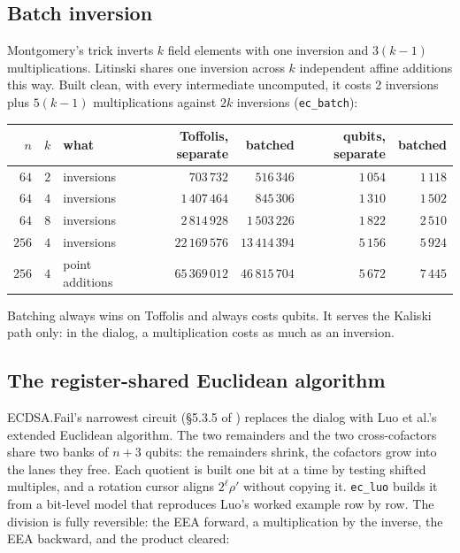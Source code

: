\documentclass[11pt]{article}
\theoremstyle{plain}
\theoremstyle{remark}
\begin{document}
\subsection{Batch inversion}

Montgomery's trick inverts $k$ field elements with one inversion and $3(k-1)$ multiplications.
Litinski \cite{ec:litinski23} shares one inversion across $k$ independent affine additions this
way. Built clean, with every intermediate uncomputed, it costs 2 inversions plus $5(k-1)$
multiplications against $2k$ inversions (\texttt{ec\_batch}):

\begin{center}\small
\begin{tabular}{rrlrrrr}
\toprule
$n$ & $k$ & what & Toffolis, separate & batched & qubits, separate & batched\\
\midrule
$64$ & $2$ & inversions & $703\,732$ & $516\,346$ & $1\,054$ & $1\,118$\\
$64$ & $4$ & inversions & $1\,407\,464$ & $845\,306$ & $1\,310$ & $1\,502$\\
$64$ & $8$ & inversions & $2\,814\,928$ & $1\,503\,226$ & $1\,822$ & $2\,510$\\
$256$ & $4$ & inversions & $22\,169\,576$ & $13\,414\,394$ & $5\,156$ & $5\,924$\\
$256$ & $4$ & point additions & $65\,369\,012$ & $46\,815\,704$ & $5\,672$ & $7\,445$\\
\bottomrule
\end{tabular}
\end{center}

\noindent Batching always wins on Toffolis and always costs qubits. It serves the Kaliski path only:
in the dialog, a multiplication costs as much as an inversion.

\subsection{The register-shared Euclidean algorithm}

ECDSA.Fail's narrowest circuit (\S5.3.5 of \cite{ec:ecdsafail26}) replaces the dialog with Luo et
al.'s extended Euclidean algorithm. The two remainders and the two cross-cofactors share two banks
of $n+3$ qubits: the remainders shrink, the cofactors grow into the lanes they free. Each quotient is
built one bit at a time by testing shifted multiples, and a rotation cursor aligns
$2^\ell\rho'$ without copying it. \texttt{ec\_luo} builds it from a bit-level model that
reproduces Luo's worked example row by row. The division is fully reversible: the EEA forward, a
multiplication by the inverse, the EEA backward, and the product cleared:
\end{document}
